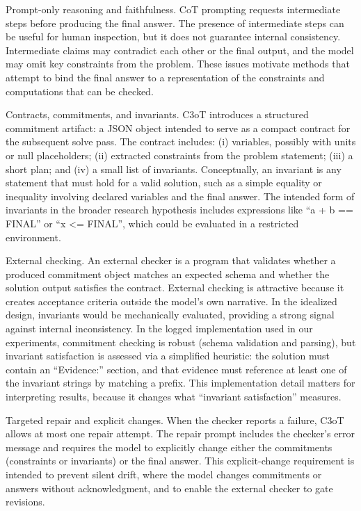 \documentclass[journal,article,submit,pdftex,moreauthors]{Definitions/mdpi}
\begin{document}
Prompt-only reasoning and faithfulness. CoT prompting requests intermediate steps before producing the final answer. The presence of intermediate steps can be useful for human inspection, but it does not guarantee internal consistency. Intermediate claims may contradict each other or the final output, and the model may omit key constraints from the problem. These issues motivate methods that attempt to bind the final answer to a representation of the constraints and computations that can be checked.

Contracts, commitments, and invariants. C3oT introduces a structured commitment artifact: a JSON object intended to serve as a compact contract for the subsequent solve pass. The contract includes: (i) variables, possibly with units or null placeholders; (ii) extracted constraints from the problem statement; (iii) a short plan; and (iv) a small list of invariants. Conceptually, an invariant is any statement that must hold for a valid solution, such as a simple equality or inequality involving declared variables and the final answer. The intended form of invariants in the broader research hypothesis includes expressions like “a + b == FINAL” or “x <= FINAL”, which could be evaluated in a restricted environment.

External checking. An external checker is a program that validates whether a produced commitment object matches an expected schema and whether the solution output satisfies the contract. External checking is attractive because it creates acceptance criteria outside the model’s own narrative. In the idealized design, invariants would be mechanically evaluated, providing a strong signal against internal inconsistency. In the logged implementation used in our experiments, commitment checking is robust (schema validation and parsing), but invariant satisfaction is assessed via a simplified heuristic: the solution must contain an “Evidence:” section, and that evidence must reference at least one of the invariant strings by matching a prefix. This implementation detail matters for interpreting results, because it changes what “invariant satisfaction” measures.

Targeted repair and explicit changes. When the checker reports a failure, C3oT allows at most one repair attempt. The repair prompt includes the checker’s error message and requires the model to explicitly change either the commitments (constraints or invariants) or the final answer. This explicit-change requirement is intended to prevent silent drift, where the model changes commitments or answers without acknowledgment, and to enable the external checker to gate revisions.
\end{document}
